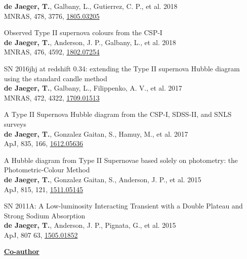 \documentclass[12pt]{article}
\begin{document}
\begin{bibenum}
\textbf{de Jaeger, T.}, Galbany, L., Gutierrez, C. P., et al. 2018\\
MNRAS, 478, 3776, \href{https://arxiv.org/abs/1805.03205}{1805.03205}
    \item 
Observed Type II supernova colours from the CSP-I\\
\textbf{de Jaeger, T.}, Anderson, J. P., Galbany, L., et al. 2018\\
MNRAS, 476, 4592, \href{https://arxiv.org/abs/1802.07254}{1802.07254}
    \item 
SN 2016jhj at redshift 0.34: extending the Type II supernova Hubble diagram using the standard candle method\\
\textbf{de Jaeger, T.}, Galbany, L., Filippenko, A. V., et al. 2017\\
MNRAS, 472, 4322, \href{https://arxiv.org/abs/1709.01513}{1709.01513}
    \item 
A Type II Supernova Hubble diagram from the CSP-I, SDSS-II, and SNLS surveys\\
\textbf{de Jaeger, T.}, Gonzalez Gaitan, S., Hamuy, M., et al. 2017\\
ApJ, 835, 166, \href{https://arxiv.org/abs/1612.05636}{1612.05636}
    \item 
A Hubble diagram from Type II Supernovae based solely on photometry: the Photometric-Colour Method\\
\textbf{de Jaeger, T.}, Gonzalez Gaitan, S., Anderson, J. P., et al. 2015\\
ApJ, 815, 121, \href{http://arxiv.org/abs/1511.05145}{1511.05145}
    \item 
SN 2011A: A Low-luminosity Interacting Transient with a Double Plateau and Strong Sodium Absorption\\
\textbf{de Jaeger, T.}, Anderson, J. P., Pignata, G., et al. 2015\\
ApJ, 807 63, \href{http://arxiv.org/abs/1505.01852}{1505.01852} 

\end{bibenum}

\vspace{3cm}
\underline{\textbf{Co-author}}
\end{document}
